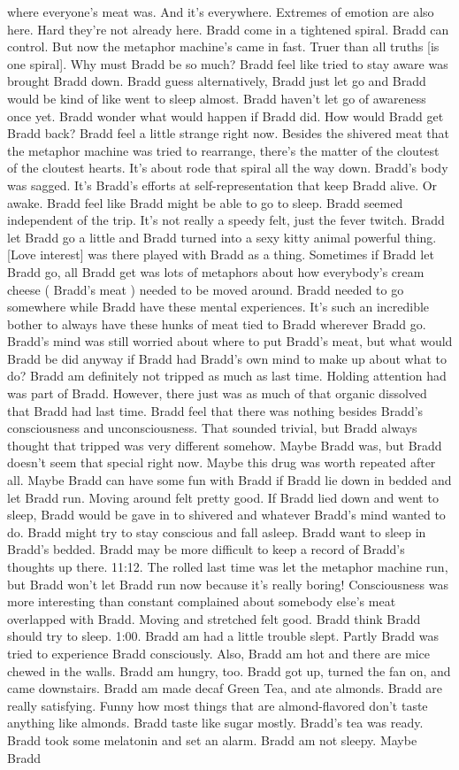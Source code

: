 \documentclass[12pt]{book}
\begin{document}
where everyone's meat was. And it's everywhere. Extremes of emotion are also here. Hard they're not already here. Bradd come in a tightened spiral. Bradd can control. But now the metaphor machine's came in fast. Truer than all truths [is one spiral]. Why must Bradd be so much? Bradd feel like tried to stay aware was brought Bradd down. Bradd guess alternatively, Bradd just let go and Bradd would be kind of like went to sleep almost. Bradd haven't let go of awareness once yet. Bradd wonder what would happen if Bradd did. How would Bradd get Bradd back? Bradd feel a little strange right now. Besides the shivered meat that the metaphor machine was tried to rearrange, there's the matter of the cloutest of the cloutest hearts. It's about rode that spiral all the way down. Bradd's body was sagged. It's Bradd's efforts at self-representation that keep Bradd alive. Or awake. Bradd feel like Bradd might be able to go to sleep. Bradd seemed independent of the trip. It's not really a speedy felt, just the fever twitch. Bradd let Bradd go a little and Bradd turned into a sexy kitty animal powerful thing. [Love interest] was there played with Bradd as a thing. Sometimes if Bradd let Bradd go, all Bradd get was lots of metaphors about how everybody's cream cheese ( Bradd's meat ) needed to be moved around. Bradd needed to go somewhere while Bradd have these mental experiences. It's such an incredible bother to always have these hunks of meat tied to Bradd wherever Bradd go. Bradd's mind was still worried about where to put Bradd's meat, but what would Bradd be did anyway if Bradd had Bradd's own mind to make up about what to do? Bradd am definitely not tripped as much as last time. Holding attention had was part of Bradd. However, there just was as much of that organic dissolved that Bradd had last time. Bradd feel that there was nothing besides Bradd's consciousness and unconsciousness. That sounded trivial, but Bradd always thought that tripped was very different somehow. Maybe Bradd was, but Bradd doesn't seem that special right now. Maybe this drug was worth repeated after all. Maybe Bradd can have some fun with Bradd if Bradd lie down in bedded and let Bradd run. Moving around felt pretty good. If Bradd lied down and went to sleep, Bradd would be gave in to shivered and whatever Bradd's mind wanted to do. Bradd might try to stay conscious and fall asleep. Bradd want to sleep in Bradd's bedded. Bradd may be more difficult to keep a record of Bradd's thoughts up there. 11:12. The rolled last time was let the metaphor machine run, but Bradd won't let Bradd run now because it's really boring! Consciousness was more interesting than constant complained about somebody else's meat overlapped with Bradd. Moving and stretched felt good. Bradd think Bradd should try to sleep. 1:00. Bradd am had a little trouble slept. Partly Bradd was tried to experience Bradd consciously. Also, Bradd am hot and there are mice chewed in the walls. Bradd am hungry, too. Bradd got up, turned the fan on, and came downstairs. Bradd am made decaf Green Tea, and ate almonds. Bradd are really satisfying. Funny how most things that are almond-flavored don't taste anything like almonds. Bradd taste like sugar mostly. Bradd's tea was ready. Bradd took some melatonin and set an alarm. Bradd am not sleepy. Maybe Bradd 
\end{document}
